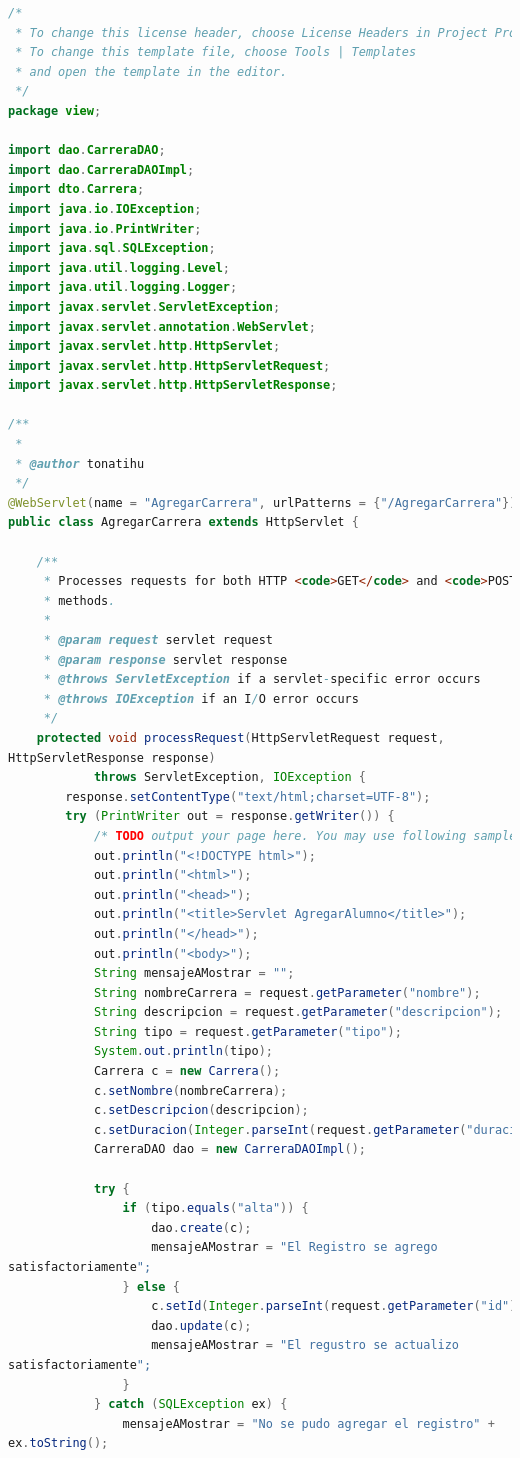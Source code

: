 \documentclass[a4paper,12pt]{article}
\begin{document}
\begin{lstlisting}[language=Java, style=customJava, 
caption={AgregarCarrera.java},captionpos=b,basicstyle=\fontfamily{cmss}\small]
/*
 * To change this license header, choose License Headers in Project Properties.
 * To change this template file, choose Tools | Templates
 * and open the template in the editor.
 */
package view;

import dao.CarreraDAO;
import dao.CarreraDAOImpl;
import dto.Carrera;
import java.io.IOException;
import java.io.PrintWriter;
import java.sql.SQLException;
import java.util.logging.Level;
import java.util.logging.Logger;
import javax.servlet.ServletException;
import javax.servlet.annotation.WebServlet;
import javax.servlet.http.HttpServlet;
import javax.servlet.http.HttpServletRequest;
import javax.servlet.http.HttpServletResponse;

/**
 *
 * @author tonatihu
 */
@WebServlet(name = "AgregarCarrera", urlPatterns = {"/AgregarCarrera"})
public class AgregarCarrera extends HttpServlet {

    /**
     * Processes requests for both HTTP <code>GET</code> and <code>POST</code>
     * methods.
     *
     * @param request servlet request
     * @param response servlet response
     * @throws ServletException if a servlet-specific error occurs
     * @throws IOException if an I/O error occurs
     */
    protected void processRequest(HttpServletRequest request, 
HttpServletResponse response)
            throws ServletException, IOException {
        response.setContentType("text/html;charset=UTF-8");
        try (PrintWriter out = response.getWriter()) {
            /* TODO output your page here. You may use following sample code. */
            out.println("<!DOCTYPE html>");
            out.println("<html>");
            out.println("<head>");
            out.println("<title>Servlet AgregarAlumno</title>");
            out.println("</head>");
            out.println("<body>");
            String mensajeAMostrar = "";
            String nombreCarrera = request.getParameter("nombre");
            String descripcion = request.getParameter("descripcion");
            String tipo = request.getParameter("tipo");
            System.out.println(tipo);
            Carrera c = new Carrera();
            c.setNombre(nombreCarrera);
            c.setDescripcion(descripcion);
            c.setDuracion(Integer.parseInt(request.getParameter("duracion")));
            CarreraDAO dao = new CarreraDAOImpl();
            
            try {
                if (tipo.equals("alta")) {
                    dao.create(c);
                    mensajeAMostrar = "El Registro se agrego 
satisfactoriamente";
                } else {
                    c.setId(Integer.parseInt(request.getParameter("id")));
                    dao.update(c);
                    mensajeAMostrar = "El regustro se actualizo 
satisfactoriamente";
                }
            } catch (SQLException ex) {
                mensajeAMostrar = "No se pudo agregar el registro" + 
ex.toString();
                

\end{lstlisting}
\end{document}
